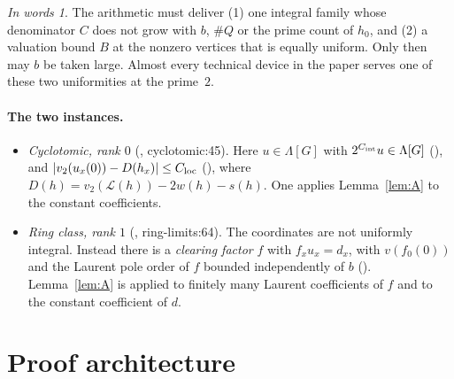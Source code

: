 \documentclass[11pt]{article}
\theoremstyle{remark}
\newtheorem*{inwords}{In words}
\newcommand{\cL}{\mathcal L}
\newcommand{\src}[2]{\textsf{\small #1:#2}}
\begin{document}
\begin{inwords}
The arithmetic must deliver (1) one integral family whose denominator $C$ does
not grow with $b$, $\#Q$ or the prime count of $h_0$, and (2) a valuation
bound $B$ at the nonzero vertices that is equally uniform. Only then may $b$
be taken large. Almost every technical device in the paper serves one of
these two uniformities at the prime~$2$.
\end{inwords}

\paragraph{The two instances.}
\begin{itemize}
\item \emph{Cyclotomic, rank $0$} (,
 \src{cyclotomic}{45}). Here $u\in\Lambda[G]$ with $2^{C_{\rm int}}u\in
 \Lambda[G]$ (), and
 $|v_2(u_x(0))-D(h_x)|\le C_{\rm loc}$ (), where
 $D(h)=v_2(\cL(h))-2w(h)-s(h)$. One applies Lemma~\ref{lem:A} to the
 constant coefficients.
\item \emph{Ring class, rank $1$} (,
 \src{ring-limits}{64}). The coordinates are not uniformly integral.
 Instead there is a \emph{clearing factor} $f$ with $f_xu_x=d_x$, with
 $v(f_0(0))$ and the Laurent pole order of $f$ bounded independently of $b$
 (). Lemma~\ref{lem:A} is applied to finitely many
 Laurent coefficients of $f$ and to the constant coefficient of $d$.
\end{itemize}

\section{Proof architecture}
\label{sec:arch}
\end{document}

